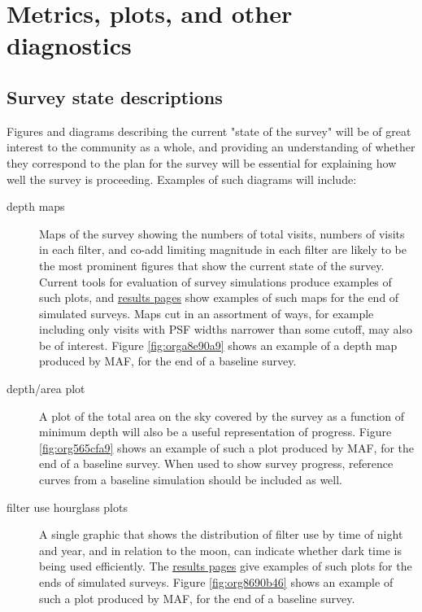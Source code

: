 \section{Metrics, plots, and other diagnostics}
\label{sec:orgc90d38c}
\subsection{Survey state descriptions}
\label{sec:orga0e463b}
Figures and diagrams describing the current "state of the survey" will be of great interest to the community as a whole, and providing an understanding of whether they correspond to the plan for the survey will be essential for explaining how well the survey is proceeding.
Examples of such diagrams will include:

\begin{description}
\item[{depth maps}] Maps of the survey showing the numbers of total visits, numbers of visits in each filter, and co-add limiting magnitude in each filter are likely to be the most prominent figures that show the current state of the survey. Current tools for evaluation of survey simulations produce examples of such plots, and \href{http://astro-lsst-01.astro.washington.edu:8081/allMetricResults?runId=392\#Basic\%20Maps}{results pages} show examples of such maps for the end of simulated surveys. Maps cut in an assortment of ways, for example including only visits with PSF widths narrower than some cutoff, may also be of interest. Figure \ref{fig:orga8e90a9} shows an example of a depth map produced by MAF, for the end of a baseline survey.
\item[{depth/area plot}] A plot of the total area on the sky covered by the survey as a function of minimum depth will also be a useful representation of progress. Figure \ref{fig:org565cfa9} shows an example of such a plot produced by MAF, for the end of a baseline survey. When used to show survey progress, reference curves from a baseline simulation should be included as well.
\item[{filter use hourglass plots}] A single graphic that shows the distribution of filter use by time of night and year, and in relation to the moon, can indicate whether dark time is being used efficiently. The \href{http://astro-lsst-01.astro.washington.edu:8081/allMetricResults?runId=392\#Hourglass}{results pages} give examples of such plots for the ends of simulated surveys. Figure \ref{fig:org8690b46} shows an example of such a plot produced by MAF, for the end of a baseline survey.

\end{description}
